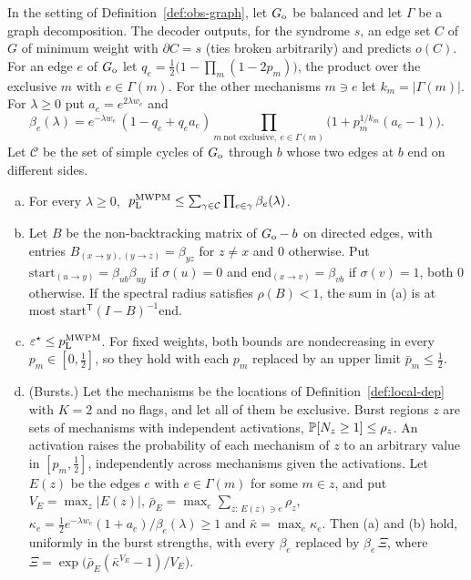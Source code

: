 \begin{theorem}\label{thm:circuit-peierls}
In the setting of Definition~\ref{def:obs-graph}, let $G_{\rm o}$ be balanced and let $\Gamma$ be a graph decomposition. The decoder outputs, for the syndrome $s$, an edge set $C$ of $G$ of minimum weight with $\partial C=s$ (ties broken arbitrarily) and predicts $o(C)$.
For an edge $e$ of $G_{\rm o}$ let $q_e=\tfrac12\big(1-\prod_{m}(1-2p_m)\big)$, the product over the exclusive $m$ with $e\in\Gamma(m)$. For the other mechanisms $m\ni e$ let $k_m=|\Gamma(m)|$. For $\lambda\ge0$ put $a_e=e^{2\lambda w_e}$ and
\[
\beta_e(\lambda)=e^{-\lambda w_e}\,(1-q_e+q_ea_e)\prod_{m\ \text{not exclusive},\ e\in\Gamma(m)}\big(1+p_m^{1/k_m}(a_e-1)\big).
\]
Let $\mathcal C$ be the set of simple cycles of $G_{\rm o}$ through $b$ whose two edges at $b$ end on different sides.
\begin{enumerate}[(a)]
\item For every $\lambda\ge0$, $\ p_{\mathrm{L}}^{\rm MWPM}\le\sum_{\gamma\in\mathcal C}\prod_{e\in\gamma}\beta_e(\lambda)$.
\item Let $B$ be the non-backtracking matrix of $G_{\rm o}-b$ on directed edges, with entries $B_{(x\to y),(y\to z)}=\beta_{yz}$ for $z\ne x$ and $0$ otherwise. Put $\mathrm{start}_{(u\to y)}=\beta_{ub}\beta_{uy}$ if $\sigma(u)=0$ and $\mathrm{end}_{(x\to v)}=\beta_{vb}$ if $\sigma(v)=1$, both $0$ otherwise. If the spectral radius satisfies $\rho(B)<1$, the sum in (a) is at most $\mathrm{start}^{\mathsf T}(I-B)^{-1}\mathrm{end}$.
\item $\varepsilon^{\star}\le p_{\mathrm{L}}^{\rm MWPM}$. For fixed weights, both bounds are nondecreasing in every $p_m\in[0,\tfrac12]$, so they hold with each $p_m$ replaced by an upper limit $\bar p_m\le\tfrac12$.
\item (Bursts.) Let the mechanisms be the locations of Definition~\ref{def:local-dep} with $K=2$ and no flags, and let all of them be exclusive. Burst regions $z$ are sets of mechanisms with independent activations, $\mathbb{P}[N_z\ge1]\le\rho_z$. An activation raises the probability of each mechanism of $z$ to an arbitrary value in $[p_m,\tfrac12]$, independently across mechanisms given the activations.
Let $E(z)$ be the edges $e$ with $e\in\Gamma(m)$ for some $m\in z$, and put $V_E=\max_z|E(z)|$, $\bar\rho_E=\max_e\sum_{z:\,E(z)\ni e}\rho_z$, $\kappa_e=\tfrac12e^{-\lambda w_e}(1+a_e)/\beta_e(\lambda)\ge1$ and $\bar\kappa=\max_e\kappa_e$.
Then (a) and (b) hold, uniformly in the burst strengths, with every $\beta_e$ replaced by $\beta_e\,\Xi$, where $\Xi=\exp\big(\bar\rho_E(\bar\kappa^{V_E}-1)/V_E\big)$.

\end{enumerate}
\end{theorem}
